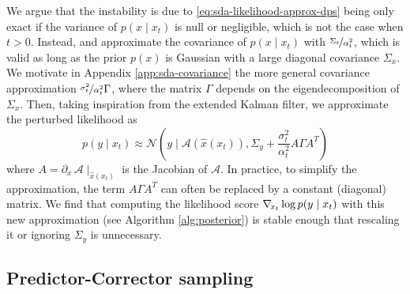 We argue that the instability is due to \eqref{eq:sda-likelihood-approx-dps} being only exact if the variance of $p(x \mid x_t)$ is null or negligible, which is not the case when $t > 0$. Instead, \textcite{adam2022posterior} and \textcite{meng2022diffusion} approximate the covariance of $p(x \mid x_t)$ with $\nicefrac{\Sigma_t}{\alpha_t^2}$, which is valid as long as the prior $p(x)$ is Gaussian with a large diagonal covariance $\Sigma_x$. We motivate in Appendix \ref{app:sda-covariance} the more general covariance approximation $\nicefrac{\sigma_t^2}{\alpha_t^2} \Gamma$, where the matrix $\Gamma$ depends on the eigendecomposition of $\Sigma_x$. Then, taking inspiration from the extended Kalman filter, we approximate the perturbed likelihood as
\begin{equation} \label{eq:sda-likelihood-approx}
    p(y \mid x_t) \approx \mathcal{N} \left( y \mid \mathcal{A}(\hat{x}(x_t)), \Sigma_y + \frac{\sigma_t^2}{\alpha_t^2} A \Gamma A^T \right)
\end{equation}
where $A = \partial_x \, \mathcal{A} \mid_{\hat{x}(x_t)}$ is the Jacobian of $\mathcal{A}$. In practice, to simplify the approximation, the term $A \Gamma A^T$ can often be replaced by a constant (diagonal) matrix. We find that computing the likelihood score $\nabla_{\!{x_t}} \log p(y \mid x_t)$ with this new approximation (see Algorithm \ref{alg:posterior}) is stable enough that rescaling it or ignoring $\Sigma_y$ is unnecessary.

\subsection{Predictor-Corrector sampling}
\label{sec:sda-sda-pc-sampling}

